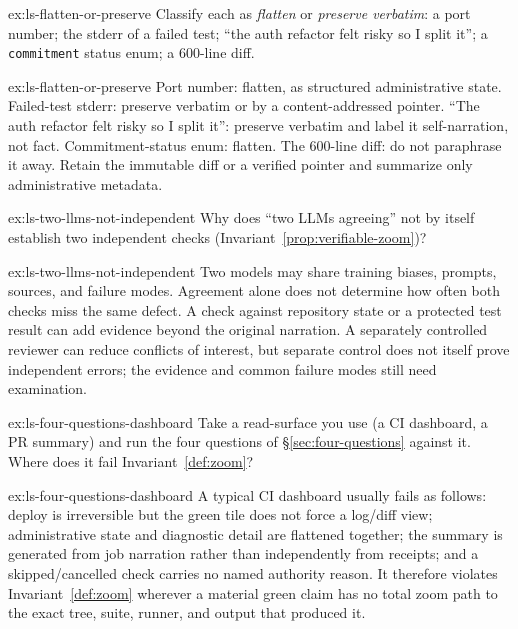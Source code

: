 \documentclass[11pt,a4paper]{article}
\theoremstyle{definition}
\theoremstyle{plain}
\begin{document}
\begin{pdexercise}[kind=Check,rating=1]{ex:ls-flatten-or-preserve}
Classify each as \emph{flatten} or \emph{preserve verbatim}: a port number;
the stderr of a failed test; ``the auth refactor felt risky so I split it''; a
\texttt{commitment} status enum; a 600-line diff.
\end{pdexercise}
\begin{pdsolution}{ex:ls-flatten-or-preserve}
Port number: flatten, as structured administrative state. Failed-test stderr: preserve verbatim or by a content-addressed pointer. ``The auth refactor felt risky so I split it'': preserve verbatim and label it self-narration, not fact. Commitment-status enum: flatten. The 600-line diff: do not paraphrase it away. Retain the immutable diff or a verified pointer and summarize only administrative metadata.
\end{pdsolution}
\begin{pdexercise}[kind=Check,rating=1]{ex:ls-two-llms-not-independent}
Why does ``two LLMs agreeing'' not by itself establish two independent
checks (Invariant~\ref{prop:verifiable-zoom})?
\end{pdexercise}
\begin{pdsolution}{ex:ls-two-llms-not-independent}
Two models may share training biases, prompts, sources, and failure modes. Agreement alone does not determine how often both checks miss the same defect. A check against repository state or a protected test result can add evidence beyond the original narration. A separately controlled reviewer can reduce conflicts of interest, but separate control does not itself prove independent errors; the evidence and common failure modes still need examination.
\end{pdsolution}
\begin{pdexercise}[kind=Trace,rating=2]{ex:ls-four-questions-dashboard}
Take a read-surface you use (a CI dashboard, a PR summary) and run the four
questions of \S\ref{sec:four-questions} against it. Where does it fail Invariant~\ref{def:zoom}?
\end{pdexercise}
\begin{pdsolution}{ex:ls-four-questions-dashboard}
A typical CI dashboard usually fails as follows: deploy is irreversible but the green tile does not force a log/diff view; administrative state and diagnostic detail are flattened together; the summary is generated from job narration rather than independently from receipts; and a skipped/cancelled check carries no named authority reason. It therefore violates Invariant~\ref{def:zoom} wherever a material green claim has no total zoom path to the exact tree, suite, runner, and output that produced it.
\end{pdsolution}
\end{document}
